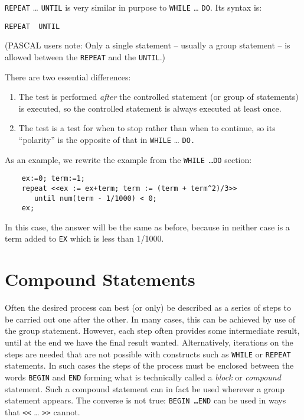 \texttt{REPEAT} \ldots{} \texttt{UNTIL} is very similar
in purpose to \texttt{WHILE} \ldots{} \texttt{DO}.  Its syntax is:
\begin{syntax}
  \texttt{REPEAT }\texttt{ UNTIL }
\end{syntax}
(PASCAL users note: Only a single statement -- usually a group statement
-- is allowed between the \texttt{REPEAT} and the \texttt{UNTIL}.)

There are two essential differences:
\begin{enumerate}
\item The test is performed \emph{after} the controlled statement (or group of
statements) is executed, so the controlled statement is always executed at
least once.

\item The test is a test for when to stop rather than when to continue, so its
``polarity'' is the opposite of that in \texttt{WHILE} \ldots{} \texttt{DO.}
\end{enumerate}

As an example, we rewrite the example from the \texttt{WHILE \ldots DO} section:
\begin{samepage}
\begin{verbatim}
    ex:=0; term:=1;
    repeat <<ex := ex+term; term := (term + term^2)/3>>
       until num(term - 1/1000) < 0;
    ex;
\end{verbatim}
\end{samepage}
In this case, the answer will be the same as before, because in neither
case is a term added to \texttt{EX} which is less than 1/1000.

\section{Compound Statements}
\hypertarget{command:BEGIN}{}

Often the desired process
can best (or only) be
described as a series of steps to be carried out one after the other.  In
many cases, this can be achieved by use of the group statement.  However, each step often provides some intermediate
result, until at the end we have the final result wanted.  Alternatively,
iterations on the steps are needed that are not possible with constructs
such as \texttt{WHILE} or \texttt{REPEAT}
statements.  In such cases the steps of the process must be
enclosed between the words \texttt{BEGIN} and \texttt{END} forming what is technically called a \emph{block} or
\emph{compound} statement.  Such a compound statement can in fact be used
wherever a group statement appears.  The converse is not true: {\tt BEGIN
\ldots END} can be used in ways 
that \texttt{<}\texttt{<} \ldots{} \texttt{>}\texttt{>} cannot.

